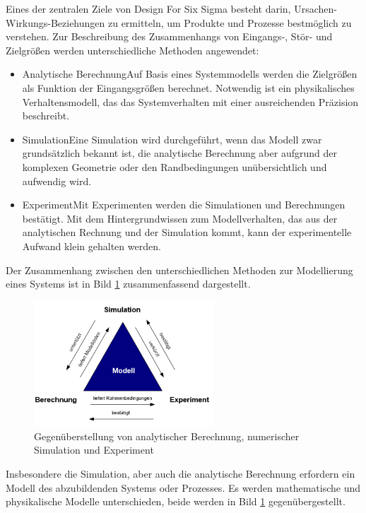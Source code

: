 \noindent Eines der zentralen Ziele von Design For Six Sigma besteht darin, Ursachen-Wirkungs-Beziehungen zu ermitteln, um Produkte und Prozesse bestm\"{o}glich zu verstehen. Zur Beschreibung des Zusammenhangs von Eingangs-, St\"{o}r- und Zielgr\"{o}{\ss}en werden unterschiedliche Methoden angewendet: 

\begin{itemize}
    \item Analytische BerechnungAuf Basis eines Systemmodells werden die Zielgr\"{o}{\ss}en als Funktion der Eingangsgr\"{o}{\ss}en berechnet. Notwendig ist ein physikalisches Verhaltensmodell, das das Systemverhalten mit einer ausreichenden Pr\"{a}zision beschreibt.
    \item  SimulationEine Simulation wird durchgef\"{u}hrt, wenn das Modell zwar grunds\"{a}tzlich bekannt ist, die analytische Berechnung aber aufgrund der komplexen Geometrie oder den Randbedingungen un\"{u}bersichtlich und aufwendig wird.
    \item  ExperimentMit Experimenten werden die Simulationen und Berechnungen best\"{a}tigt. Mit dem Hintergrundwissen zum Modellverhalten, das aus der analytischen Rechnung und der Simulation kommt, kann der experimentelle Aufwand klein gehalten werden. 
\end{itemize}

\noindent Der Zusammenhang zwischen den unterschiedlichen Methoden zur Modellierung eines Systems ist in Bild \ref{fig:Modell} zusammenfassend dargestellt.

\noindent 
\begin{figure}[H]
  \centerline{\includegraphics[width=0.6\textwidth]{Kapitel12/Bilder/image1}}
  \caption{Gegen\"{u}berstellung von analytischer Berechnung, numerischer Simulation und Experiment}
  \label{fig:Modell}
\end{figure}

\noindent Insbesondere die Simulation, aber auch die analytische Berechnung erfordern ein Modell des abzubildenden Systems oder Prozesses. Es werden mathematische und physikalische Modelle unterschieden, beide werden in Bild \ref{fig:Modell} gegen\"{u}bergestellt.


